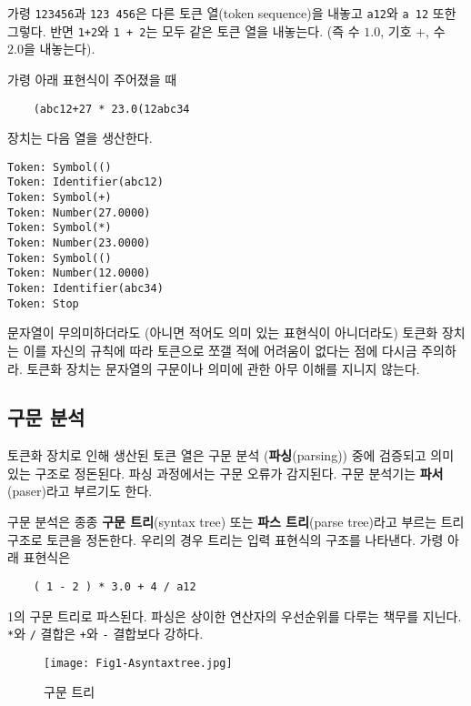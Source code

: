 \documentclass[a4paper]{oblivoir}
\begin{document}
가령 \texttt{123456}과 \texttt{123 456}은 다른 토큰 열(token sequence)을 내놓고 \texttt{a12}와 \texttt{a 12} 또한 그렇다. 반면 \texttt{1+2}와 \texttt{1 + 2}는 모두 같은 토큰 열을 내놓는다. (즉 수 $1.0$, 기호 $+$, 수 $2.0$을 내놓는다).

가령 아래 표현식이 주어졌을 때

\begin{lstlisting}
    (abc12+27 * 23.0(12abc34 
\end{lstlisting}

 장치는 다음 열을 생산한다.
    
\begin{lstlisting}
Token: Symbol(()
Token: Identifier(abc12)
Token: Symbol(+)
Token: Number(27.0000)
Token: Symbol(*)
Token: Number(23.0000)
Token: Symbol(()
Token: Number(12.0000)
Token: Identifier(abc34)
Token: Stop
\end{lstlisting}

문자열이 무의미하더라도 (아니면 적어도 의미 있는 표현식이 아니더라도) 토큰화 장치는 이를 자신의 규칙에 따라 토큰으로 쪼갤 적에 어려움이 없다는 점에 다시금 주의하라. 토큰화 장치는 문자열의 구문이나 의미에 관한 아무 이해를 지니지 않는다.

\subsection*{구문 분석}

토큰화 장치로 인해 생산된 토큰 열은 구문 분석 (\textbf{파싱}(parsing)) 중에 검증되고 의미 있는 구조로 정돈된다. 파싱 과정에서는  구문 오류가 감지된다. 구문 분석기는 \textbf{파서}(paser)라고 부르기도 한다.

구문 분석은 종종 \textbf{구문 트리}(syntax tree) 또는 \textbf{파스 트리}(parse tree)라고 부르는 트리 구조로 토큰을 정돈한다. 우리의 경우 트리는 입력 표현식의 구조를 나타낸다. 가령 아래 표현식은

\begin{lstlisting}
    ( 1 - 2 ) * 3.0 + 4 / a12
\end{lstlisting}

 1의 구문 트리로 파스된다. 파싱은 상이한 연산자의 우선순위를 다루는 책무를 지닌다. \texttt{*}와 \texttt{/} 결합은 \texttt{+}와 \texttt{-} 결합보다 강하다.

\begin{figure}[h]
    \centering
    \texttt{[image: Fig1-Asyntaxtree.jpg]}
    \caption{구문 트리}
\end{figure}
\end{document}
